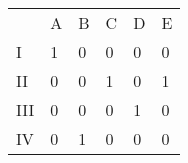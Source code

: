 \begin{table}[H]
    \centering

    \begin{tabular}{lccccc}
        & A                              & B                              & C                              & D                              & E                                 \\ \cline{2-6} 
\multicolumn{1}{l|}{I}   & \multicolumn{1}{l|}{1} & \multicolumn{1}{l|}{0} & \multicolumn{1}{l|}{0} & \multicolumn{1}{l|}{0}  & \multicolumn{1}{l|}{0}  \\ \cline{2-6} 
\multicolumn{1}{l|}{II}  & \multicolumn{1}{l|}{0} & \multicolumn{1}{l|}{0} & \multicolumn{1}{l|}{1} & \multicolumn{1}{l|}{0}  & \multicolumn{1}{l|}{1} \\ \cline{2-6} 
\multicolumn{1}{l|}{III} & \multicolumn{1}{l|}{0} & \multicolumn{1}{l|}{0} & \multicolumn{1}{l|}{0} & \multicolumn{1}{l|}{1} & \multicolumn{1}{l|}{0} \\ \cline{2-6} 
\multicolumn{1}{l|}{IV}  & \multicolumn{1}{l|}{0} & \multicolumn{1}{l|}{1} & \multicolumn{1}{l|}{0} & \multicolumn{1}{l|}{0} & \multicolumn{1}{l|}{0} \\ \cline{2-6} 
\end{tabular}

\end{table}

